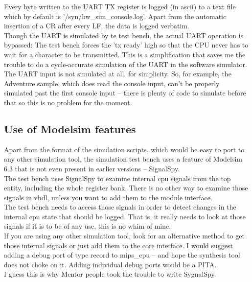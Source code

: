 \documentclass[11pt]{article}
\begin{document}
    Every byte written to the UART TX register is logged (in ascii) to a text
    file which by default is '/syn/hw\_sim\_console.log'. Apart from the
    automatic insertion of a CR after every LF, the data is logged verbatim.\\
    
    Though the UART is simulated by te test bench, the actual UART operation is 
    bypassed: The test bench forces the 'tx ready' high so that the CPU never has
    to wait for a character to be transmitted. This is a simplification that 
    saves me the trouble to do a cycle-accurate simulation of the UART in the 
    software simulator.\\
    
    The UART input is not simulated at all, for simplicity. So, for example, the
    Adventure sample, which does read the console input, can't be properly 
    simulated past the first console input -- there is plenty of code to simulate 
    before that so this is no problem for the moment.\\


\subsection{Use of Modelsim features}
\label{modelsim_dependencies}

    Apart from the format of the simulation scripts, which would be easy to port
    to any other simulation tool, the simulation test bench uses a feature of
    Modelsim 6.3 that is not even present in earlier versions -- SignalSpy.\\

    The test bench uses SignalSpy to examine internal cpu signals from the top
    entity, including the whole register bank. There is no other way to examine
    those signals in vhdl, unless you want to add them to the module interface.\\

    The test bench needs to access those signals in order to detect changes in
    the internal cpu state that should be logged. That is, it really needs to
    look at those signals if it is to be of any use, this is no whim of mine.\\

    If you are using any other simulation tool, look for an alternative method
    to get those internal signals or just add them to the core interface. I
    would suggest adding a debug port of type record to mips\_cpu -- and hope the
    synthesis tool does not choke on it. Adding individual debug ports would be
    a PITA.\\
    I guess this is why Mentor people took the trouble to write SygnalSpy.\\
\end{document}
